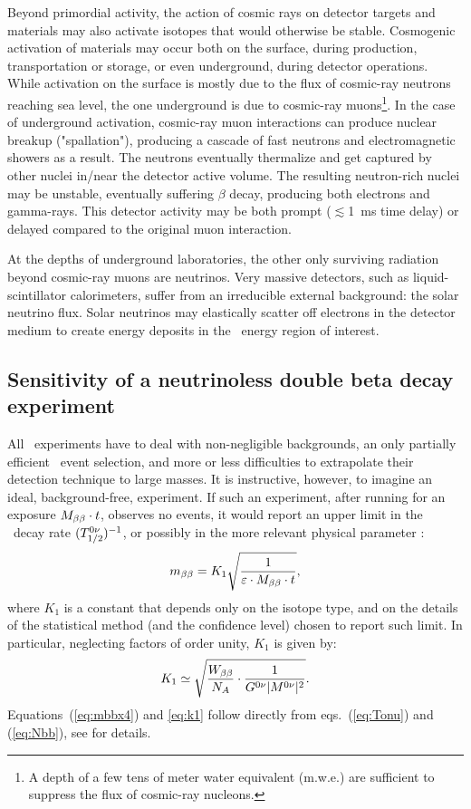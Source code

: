 Beyond primordial activity, the action of cosmic rays on detector targets and materials may also activate isotopes that would otherwise be stable. Cosmogenic activation of materials may occur both on the surface, during production, transportation or storage, or even underground, during detector operations. While activation on the surface is mostly due to the flux of cosmic-ray neutrons reaching sea level, the one underground is due to cosmic-ray muons\footnote{A depth of a few tens of meter water equivalent (m.w.e.) are sufficient to suppress the flux of cosmic-ray nucleons.}. In the case of underground activation, cosmic-ray muon interactions can produce nuclear breakup ("spallation"), producing a cascade of fast neutrons and electromagnetic showers as a result. The neutrons eventually thermalize and get captured by other nuclei in/near the detector active volume. The resulting neutron-rich nuclei may be unstable, eventually suffering $\beta$ decay, producing both electrons and gamma-rays. This detector activity may be both prompt ($\lesssim$1~ms time delay) or delayed compared to the original muon interaction.

At the depths of underground laboratories, the other only surviving radiation beyond cosmic-ray muons are neutrinos. Very massive detectors, such as liquid-scintillator calorimeters, suffer from an irreducible external background: the solar neutrino flux. Solar neutrinos may elastically scatter off electrons in the detector medium to create energy deposits in the \bbonu\ energy region of interest.


\subsection{Sensitivity of a neutrinoless double beta decay experiment} \label{subsec:sensitivitydefinition}

All \bbonu\ experiments have to deal with non-negligible backgrounds, an only partially efficient \bbonu\ event selection, and more or less difficulties to extrapolate their detection technique to large masses. It is instructive, however, to imagine an ideal, background-free, experiment. If such an experiment, after running for an exposure $M_{\beta\beta}\cdot t$, observes no events, it would report an upper limit in the \bbonu\ decay rate $(T^{0\nu}_{1/2})^{-1}$, or possibly in the more relevant physical parameter \mbb:
%
\begin{equation}
m_{\beta\beta} = K_{1} \sqrt{\frac{1}{\varepsilon\cdot M_{\beta\beta} \cdot t}}, \label{eq:mbbx4}
\end{equation}
%
where $K_{1}$ is a constant that depends only on the isotope type, and on the details of the statistical method (and the confidence level) chosen to report such limit. In particular, neglecting factors of order unity, $K_{1}$ is given by:
%
\begin{equation}
K_{1} \simeq \sqrt{\frac{W_{\beta\beta}}{N_A}\cdot \frac{1}{G^{0\nu}\lvert M^{0\nu}\rvert^2}}. \label{eq:k1}
\end{equation}
%
Equations~(\ref{eq:mbbx4}) and \ref{eq:k1} follow directly from eqs.~(\ref{eq:Tonu}) and (\ref{eq:Nbb}), see \cite{Gomez-Cadenas:2010zcc} for details.

